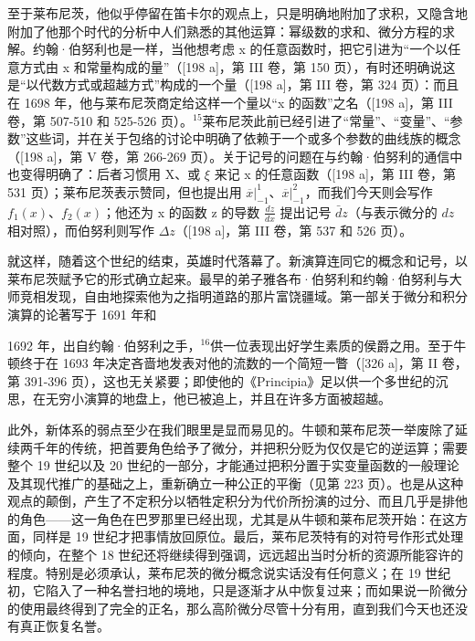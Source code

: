 至于莱布尼茨，他似乎停留在笛卡尔的观点上，只是明确地附加了求积，又隐含地附加了他那个时代的分析中人们熟悉的其他运算：幂级数的求和、微分方程的求解。约翰·伯努利也是一样，当他想考虑 x 的任意函数时，把它引进为“一个以任意方式由 x 和常量构成的量”（{[}198 a{]}，第 III 卷，第 150 页），有时还明确说这是“以代数方式或超越方式”构成的一个量（{[}198 a{]}，第 III 卷，第 324 页）：而且在 1698 年，他与莱布尼茨商定给这样一个量以“x 的函数”之名（{[}198 a{]}，第 III 卷，第 507-510 和 525-526 页）。\(^{15}\)莱布尼茨此前已经引进了“常量”、“变量”、“参数”这些词，并在关于包络的讨论中明确了依赖于一个或多个参数的曲线族的概念（{[}198 a{]}，第 V 卷，第 266-269 页）。关于记号的问题在与约翰·伯努利的通信中也变得明确了：后者习惯用 X、或 \(\xi\) 来记 x 的任意函数（{[}198 a{]}，第 III 卷，第 531 页）；莱布尼茨表示赞同，但也提出用 \(\overline{x}|_{-1}^{1}\)、\(\overline{x}|_{-1}^{2}\)，而我们今天则会写作 \(f_{1}(x)\)、\(f_{2}(x)\)；他还为 x 的函数 z 的导数 \(\frac{dz}{dx}\) 提出记号 \(\bar{d}z\)（与表示微分的 \(dz\) 相对照），而伯努利则写作 \(\Delta z\)（{[}198 a{]}，第 III 卷，第 537 和 526 页）。

就这样，随着这个世纪的结束，英雄时代落幕了。新演算连同它的概念和记号，以莱布尼茨赋予它的形式确立起来。最早的弟子雅各布·伯努利和约翰·伯努利与大师竞相发现，自由地探索他为之指明道路的那片富饶疆域。第一部关于微分和积分演算的论著写于 1691 年和

1692 年，出自约翰·伯努利之手，\(^{16}\)供一位表现出好学生素质的侯爵之用。至于牛顿终于在 1693 年决定吝啬地发表对他的流数的一个简短一瞥（{[}326 a{]}，第 II 卷，第 391-396 页），这也无关紧要；即使他的《Principia》足以供一个多世纪的沉思，在无穷小演算的地盘上，他已被追上，并且在许多方面被超越。

此外，新体系的弱点至少在我们眼里是显而易见的。牛顿和莱布尼茨一举废除了延续两千年的传统，把首要角色给予了微分，并把积分贬为仅仅是它的逆运算；需要整个 19 世纪以及 20 世纪的一部分，才能通过把积分置于实变量函数的一般理论及其现代推广的基础之上，重新确立一种公正的平衡（见第 223 页）。也是从这种观点的颠倒，产生了不定积分以牺牲定积分为代价所扮演的过分、而且几乎是排他的角色——这一角色在巴罗那里已经出现，尤其是从牛顿和莱布尼茨开始：在这方面，同样是 19 世纪才把事情放回原位。最后，莱布尼茨特有的对符号作形式处理的倾向，在整个 18 世纪还将继续得到强调，远远超出当时分析的资源所能容许的程度。特别是必须承认，莱布尼茨的微分概念说实话没有任何意义；在 19 世纪初，它陷入了一种名誉扫地的境地，只是逐渐才从中恢复过来；而如果说一阶微分的使用最终得到了完全的正名，那么高阶微分尽管十分有用，直到我们今天也还没有真正恢复名誉。
